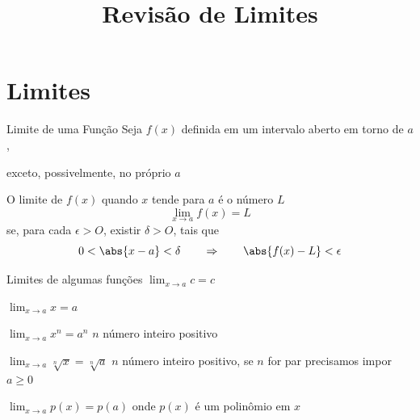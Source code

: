 
\usepackage{calculo_varias_variaveis-1}

\title{Revisão de Limites}



\addtitle

\section{Limites}

\begin{frame}{Limite de uma Função}
  Seja $f(x)$ definida em um intervalo aberto em torno de $a$,

  \pause
  exceto, possivelmente, no próprio $a$

  \pause
  O limite de $f(x)$ quando $x$ tende para $a$ é o número $L$
  \[
    \lim_{x\to a} f(x) = L
  \]
  \pause
  se, para cada \(\epsilon > O\), existir \(\delta > O\), tais que
  \pause
  \[
    0 < \abs{x-a} < \delta \qquad\Rightarrow\qquad \abs{f(x)-L} < \epsilon
  \]
\end{frame}



\begin{frame}{Limites de algumas funções}
  \( \lim_{x\to a} c = c \)

  \pause
  \vspace{0.5\baselineskip}
  \( \lim_{x\to a} x = a \)

  \pause
  \vspace{0.5\baselineskip}
  \( \lim_{x\to a} x^n = a^n \)
  \tabto{35mm}
  $n$ número inteiro positivo

  \pause
  \vspace{0.5\baselineskip}
  \( \lim_{x\to a} \sqrt[n]{x} = \sqrt[n]{a} \)
  \tabto{35mm}
  $n$ número inteiro positivo, se $n$ for par precisamos impor $a\geq 0$

  \pause
  \vspace{0.5\baselineskip}
  \( \lim_{x\to a} p(x) = p(a) \)
  \tabto{35mm}
  onde $p(x)$ é um polinômio em $x$
\end{frame}

